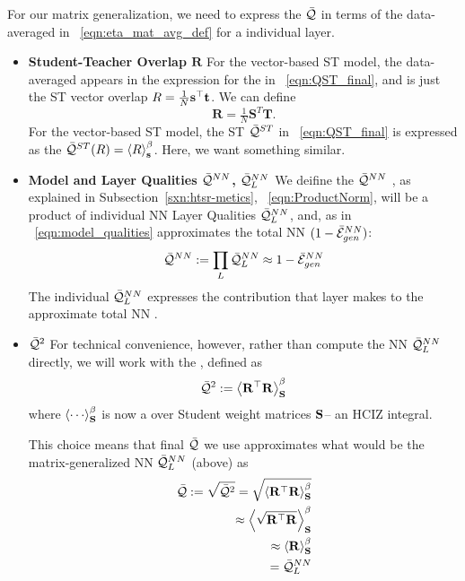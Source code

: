 For our matrix generalization, we need to express the \LayerQuality $\bar{\mathcal{Q}}$ in terms of the data-averaged
\SelfOverlap in \EQN~\ref{eqn:eta_mat_avg_def} for a individual layer.
\begin{itemize}
\item
\textbf{Student-Teacher Overlap  $\mathbf{R}$}
For the vector-based \Perceptron ST model, the data-averaged \SelfOverlap appears in the expression for the
\LayerQuality  in \EQN~\ref{eqn:QST_final}, and is just the ST vector overlap  $R=\frac{1}{N}{\mathbf{s}}^{\top}{\mathbf{t}}$. 
We can define
\begin{equation}
\mathbf{R} = \tfrac{1}{N} \mathbf{S}^{T} \mathbf{T}  .
\end{equation}
For the vector-based ST model, the ST \Quality $\bar{\mathcal{Q}}^{ST}$ in \EQN~\ref{eqn:QST_final} is expressed as
the \ThermalAverage $\bar{\mathcal{Q}}^{ST}(R)=\left\langle R \right\rangle_{\mathbf s}^{\beta}$. Here, we want something similar.
\item
\textbf{Model and Layer Qualities $\bar{\mathcal{Q}}^{NN}$, $\bar{\mathcal{Q}}^{NN}_{L}$}
We deifine the \ModelQuality $\bar{\mathcal{Q}}^{NN}$ ,
as explained in Subsection~\ref{sxn:htsr-metics}, \EQN~\ref{eqn:ProductNorm},
will be a product of individual NN Layer Qualities $\bar{\mathcal{Q}}^{NN}_{L}$,
and, as in \EQN~\ref{eqn:model_qualities}
approximates the total NN \AverageGeneralizationAccuracy $(1-\bar{\mathcal{E}}_{gen}^{NN})$:
\begin{equation}
 \bar{\mathcal{Q}}^{NN}:=\prod_{L}\bar{\mathcal{Q}}^{NN}_{L}\approx 1-\bar{\mathcal{E}}_{gen}^{NN} 
\end{equation}
The individual $\bar{\mathcal{Q}}^{NN}_{L}$ expresses the contribution that layer makes
to the approximate total NN \AverageGeneralizationAccuracy.
\item
 \textbf{\LayerQualitySquared $\bar{\mathcal{Q}}^{2}$}
For  technical convenience, however, rather than compute
the NN \LayerQuality $\bar{\mathcal{Q}}^{NN}_{L}$ directly, we will work with the \emph{\AverageLayerQualitySquared}, 
defined as
\begin{align}
  \label{eqn:QT_1}
  \bar{\mathcal{Q}}^{2}:=\left\langle {\mathbf{R}}^{\top}\mathbf{R} \right\rangle_{\mathbf S}^{\beta}
\end{align}
where  $\THRMAVGIZ{\cdots}$ is now a \ThermalAverage over Student weight matrices ${\mathbf{S}}$--
an HCIZ integral.

This choice means that final \LayerQuality $\bar{\mathcal{Q}}$ we use approximates what would be the
matrix-generalized NN \LayerQuality $\bar{\mathcal{Q}}^{NN}_{L}$ (above) as
\begin{align}
  \label{eqn:QT_2}
  \bar{\mathcal{Q}}:=\sqrt{\bar{\mathcal{Q}}^{2}}
  =\sqrt{\left\langle {\mathbf{R}}^{\top}\mathbf{R} \right\rangle_{\mathbf S}^{\beta}} \\ \nonumber
  \approx\left\langle \sqrt{{\mathbf{R}}^{\top}\mathbf{R}} \right\rangle_{\mathbf S}^{\beta} \\ \nonumber
  \approx\left\langle \mathbf{R} \right\rangle_{\mathbf S}^{\beta} \\ \nonumber
  = \bar{\mathcal{Q}}^{NN}_{L}
\end{align}


\end{itemize}
